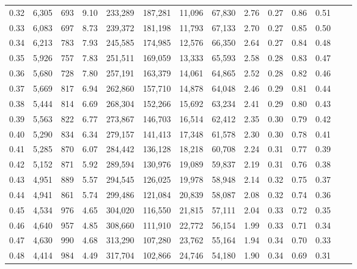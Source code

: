 \begin{tabular}{rrrrrrrrrrrrrr}
0.32 &  6,305 &    693 &    9.10 &  233,289 &  187,281 &  11,096 &  67,830 &  2.76 &  0.27 &  0.86 &      0.51 \\
0.33 &  6,083 &    697 &    8.73 &  239,372 &  181,198 &  11,793 &  67,133 &  2.70 &  0.27 &  0.85 &      0.50 \\
0.34 &  6,213 &    783 &    7.93 &  245,585 &  174,985 &  12,576 &  66,350 &  2.64 &  0.27 &  0.84 &      0.48 \\
0.35 &  5,926 &    757 &    7.83 &  251,511 &  169,059 &  13,333 &  65,593 &  2.58 &  0.28 &  0.83 &      0.47 \\
0.36 &  5,680 &    728 &    7.80 &  257,191 &  163,379 &  14,061 &  64,865 &  2.52 &  0.28 &  0.82 &      0.46 \\
0.37 &  5,669 &    817 &    6.94 &  262,860 &  157,710 &  14,878 &  64,048 &  2.46 &  0.29 &  0.81 &      0.44 \\
0.38 &  5,444 &    814 &    6.69 &  268,304 &  152,266 &  15,692 &  63,234 &  2.41 &  0.29 &  0.80 &      0.43 \\
0.39 &  5,563 &    822 &    6.77 &  273,867 &  146,703 &  16,514 &  62,412 &  2.35 &  0.30 &  0.79 &      0.42 \\
0.40 &  5,290 &    834 &    6.34 &  279,157 &  141,413 &  17,348 &  61,578 &  2.30 &  0.30 &  0.78 &      0.41 \\
0.41 &  5,285 &    870 &    6.07 &  284,442 &  136,128 &  18,218 &  60,708 &  2.24 &  0.31 &  0.77 &      0.39 \\
0.42 &  5,152 &    871 &    5.92 &  289,594 &  130,976 &  19,089 &  59,837 &  2.19 &  0.31 &  0.76 &      0.38 \\
0.43 &  4,951 &    889 &    5.57 &  294,545 &  126,025 &  19,978 &  58,948 &  2.14 &  0.32 &  0.75 &      0.37 \\
0.44 &  4,941 &    861 &    5.74 &  299,486 &  121,084 &  20,839 &  58,087 &  2.08 &  0.32 &  0.74 &      0.36 \\
0.45 &  4,534 &    976 &    4.65 &  304,020 &  116,550 &  21,815 &  57,111 &  2.04 &  0.33 &  0.72 &      0.35 \\
0.46 &  4,640 &    957 &    4.85 &  308,660 &  111,910 &  22,772 &  56,154 &  1.99 &  0.33 &  0.71 &      0.34 \\
0.47 &  4,630 &    990 &    4.68 &  313,290 &  107,280 &  23,762 &  55,164 &  1.94 &  0.34 &  0.70 &      0.33 \\
0.48 &  4,414 &    984 &    4.49 &  317,704 &  102,866 &  24,746 &  54,180 &  1.90 &  0.34 &  0.69 &      0.31 \\

\end{tabular}
